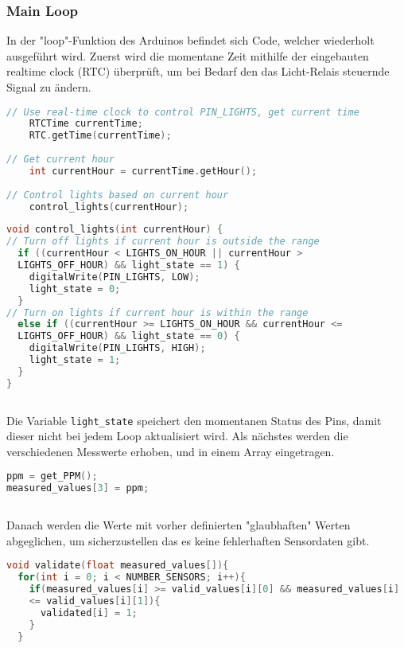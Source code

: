 \documentclass{report}
\begin{document}
\subsubsection{Main Loop}
In der "loop"-Funktion des Arduinos befindet sich Code, welcher wiederholt ausgeführt wird. Zuerst wird die momentane Zeit mithilfe der eingebauten realtime clock (RTC) überprüft, um bei Bedarf den das Licht-Relais steuernde Signal zu ändern. 
\vspace{20pt}
\begin{lstlisting}[language = C, caption = Abfrage der RTC und Aufruf der control lights Funktion]
// Use real-time clock to control PIN_LIGHTS, get current time
    RTCTime currentTime;
    RTC.getTime(currentTime);
  
// Get current hour
    int currentHour = currentTime.getHour();
  
// Control lights based on current hour
    control_lights(currentHour);
\end{lstlisting}
\vspace{20pt}
\begin{lstlisting}[language = C, caption = control lights Funktion]
void control_lights(int currentHour) {
// Turn off lights if current hour is outside the range
  if ((currentHour < LIGHTS_ON_HOUR || currentHour >
  LIGHTS_OFF_HOUR) && light_state == 1) {
    digitalWrite(PIN_LIGHTS, LOW);
    light_state = 0;
  } 
// Turn on lights if current hour is within the range
  else if ((currentHour >= LIGHTS_ON_HOUR && currentHour <=
  LIGHTS_OFF_HOUR) && light_state == 0) {
    digitalWrite(PIN_LIGHTS, HIGH);
    light_state = 1;
  }
}
    
\end{lstlisting}
\vspace{20pt}
Die Variable \verb+light_state+ speichert den momentanen Status des Pins, damit dieser nicht bei jedem Loop aktualisiert wird.
Als nächstes werden die verschiedenen Messwerte erhoben, und in einem Array eingetragen.
\vspace{20pt}
\begin{lstlisting}[language = C, caption = Mess- und Arrayeintrag(Beispiel)]
ppm = get_PPM();
measured_values[3] = ppm;
    
\end{lstlisting}
\vspace{20pt}
Danach werden die Werte mit vorher definierten "glaubhaften" Werten abgeglichen, um sicherzustellen das es keine fehlerhaften Sensordaten gibt.
\vspace{20pt}
\begin{lstlisting}[language = C,caption = "Validate" Funktion]
void validate(float measured_values[]){
  for(int i = 0; i < NUMBER_SENSORS; i++){
    if(measured_values[i] >= valid_values[i][0] && measured_values[i] 
    <= valid_values[i][1]){
      validated[i] = 1;
    }
  }
    
\end{lstlisting}
\end{document}
